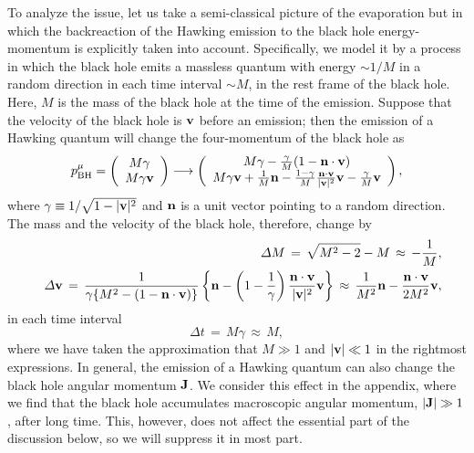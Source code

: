 \documentclass[12pt]{article}
\begin{document}
To analyze the issue, let us take a semi-classical picture of the 
evaporation but in which the backreaction of the Hawking emission to the 
black hole energy-momentum is explicitly taken into account.  Specifically, 
we model it by a process in which the black hole emits a massless quantum 
with energy $\sim 1/M$ in a random direction in each time interval 
$\sim M$, in the rest frame of the black hole.  Here, $M$ is the mass 
of the black hole at the time of the emission.  Suppose that the velocity 
of the black hole is ${\bf v}$ before an emission; then the emission of 
a Hawking quantum will change the four-momentum of the black hole as
%
\begin{equation}
  p_{\rm BH}^\mu = \left( \begin{array}{cc} 
    M\gamma \\ M\gamma {\bf v} \end{array} \right) 
  \longrightarrow \left( \begin{array}{cc} 
    M\gamma - \frac{\gamma}{M}(1-{\bf n}\cdot{\bf v}) \\ 
    M\gamma {\bf v} + \frac{1}{M}{\bf n} 
      - \frac{1-\gamma}{M}\frac{{\bf n}\cdot{\bf v}}{|{\bf v}|^2} 
      {\bf v} - \frac{\gamma}{M} {\bf v} \end{array} \right),
\label{eq:BH-emit}
\end{equation}
%
where $\gamma \equiv 1/\sqrt{1-|{\bf v}|^2}$ and ${\bf n}$ is a unit vector 
pointing to a random direction.  The mass and the velocity of the black hole, 
therefore, change by
%
\begin{eqnarray}
  && \varDelta M \,=\, \sqrt{M^2-2} - M 
  \,\approx\, -\frac{1}{M},
\label{eq:delta-M}\\
  && \varDelta {\bf v} \,=\, \frac{1}{\gamma \{M^2-(1-{\bf n}\cdot{\bf v})\}}
    \left\{ {\bf n} - \left(1-\frac{1}{\gamma}\right) 
    \frac{{\bf n}\cdot{\bf v}}{|{\bf v}|^2} {\bf v} \right\}
  \,\approx\, \frac{1}{M^2}{\bf n} 
    - \frac{{\bf n}\cdot{\bf v}}{2M^2} {\bf v},
\label{eq:delta-v}
\end{eqnarray}
%
in each time interval
%
\begin{equation}
  \varDelta t \,=\, M \gamma \,\approx\, M,
\label{eq:delta-t}
\end{equation}
%
where we have taken the approximation that $M \gg 1$ and $|{\bf v}| \ll 1$ 
in the rightmost expressions.  In general, the emission of a Hawking 
quantum can also change the black hole angular momentum ${\bf J}$.  We 
consider this effect in the appendix, where we find that the black hole 
accumulates macroscopic angular momentum, $|{\bf J}| \gg 1$, after long 
time.  This, however, does not affect the essential part of the discussion 
below, so we will suppress it in most part.
\end{document}
